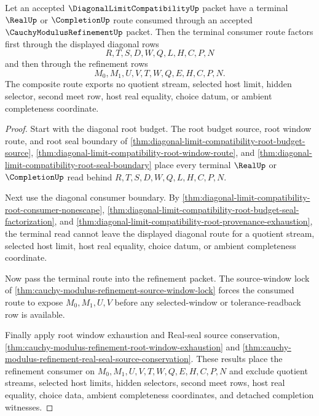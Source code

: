 \begin{theorem}
\label{thm:diagonal-limit-compatibility-cauchy-modulus-refinement-route}
Let an accepted $\DiagonalLimitCompatibilityUp$ packet have a terminal $\RealUp$ or $\CompletionUp$ route consumed through an accepted $\CauchyModulusRefinementUp$ packet. Then the terminal consumer route factors first through the displayed diagonal rows
$$
R,T,S,D,W,Q,L,H,C,P,N
$$
and then through the refinement rows
$$
M_0,M_1,U,V,T,W,Q,E,H,C,P,N.
$$
The composite route exports no quotient stream, selected host limit, hidden selector, second meet row, host real equality, choice datum, or ambient completeness coordinate.
\end{theorem}
\begin{proof}
Start with the diagonal root budget. The root budget source, root window route, and root seal boundary of \autoref{thm:diagonal-limit-compatibility-root-budget-source}, \autoref{thm:diagonal-limit-compatibility-root-window-route}, and \autoref{thm:diagonal-limit-compatibility-root-seal-boundary} place every terminal $\RealUp$ or $\CompletionUp$ read behind $R,T,S,D,W,Q,L,H,C,P,N$.

Next use the diagonal consumer boundary. By \autoref{thm:diagonal-limit-compatibility-root-consumer-nonescape}, \autoref{thm:diagonal-limit-compatibility-root-budget-seal-factorization}, and \autoref{thm:diagonal-limit-compatibility-root-provenance-exhaustion}, the terminal read cannot leave the displayed diagonal route for a quotient stream, selected host limit, host real equality, choice datum, or ambient completeness coordinate.

Now pass the terminal route into the refinement packet. The source-window lock of \autoref{thm:cauchy-modulus-refinement-source-window-lock} forces the consumed route to expose $M_0,M_1,U,V$ before any selected-window or tolerance-readback row is available.

Finally apply root window exhaustion and Real-seal source conservation, \autoref{thm:cauchy-modulus-refinement-root-window-exhaustion} and \autoref{thm:cauchy-modulus-refinement-real-seal-source-conservation}. These results place the refinement consumer on $M_0,M_1,U,V,T,W,Q,E,H,C,P,N$ and exclude quotient streams, selected host limits, hidden selectors, second meet rows, host real equality, choice data, ambient completeness coordinates, and detached completion witnesses.
\end{proof}

